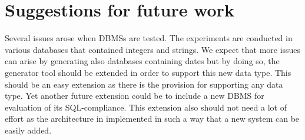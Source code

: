 \section{Suggestions for future work}
Several issues arose when DBMSs are tested. The experiments are conducted in various databases that contained integers and strings. We expect that more issues can arise by generating also databases containing dates but by doing so, the generator tool should be extended in order to support this new data type. This should be an easy extension as there is the provision for supporting any data type. Yet another future extension could be to include a new DBMS for evaluation of its SQL-compliance. This extension also should not need a lot of effort as the architecture in implemented in such a way that a new system can be easily added.

